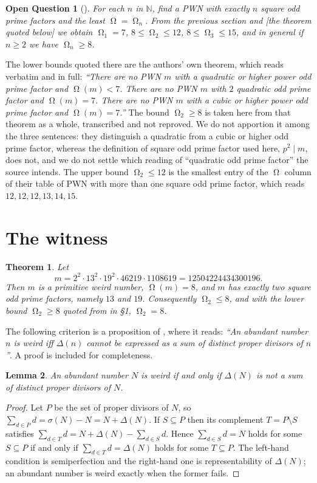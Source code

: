 \documentclass[11pt]{amsart}
\newtheorem{theorem}{Theorem}
\newtheorem{lemma}[theorem]{Lemma}
\DeclareMathOperator{\Om}{\Omega}
\newcommand{\sig}{\sigma}
\begin{document}
\medskip
\noindent\textbf{Open Question 1} (\cite{AHMP19}).
\emph{For each $n$ in $\mathbb N$, find a PWN with exactly $n$ square odd
prime factors and the least $\Om=\Om_n$. From the previous section and
\textup{[the theorem quoted below]} we obtain $\Om_1=7$,
$8\le\Om_2\le12$, $8\le\Om_3\le15$, and in general if $n\ge2$ we have
$\Om_n\ge8$.}

\medskip
The lower bounds quoted there are the authors' own theorem, which reads
verbatim and in full: \emph{``There are no PWN $m$ with a quadratic
or higher power odd prime factor and $\Om(m)<7$. There are no PWN $m$ with $2$
quadratic odd prime factor and $\Om(m)=7$. There are no PWN $m$ with a cubic
or higher power odd prime factor and $\Om(m)=7$.''} The bound $\Om_2\ge8$ is
taken here from that theorem as a whole, transcribed and not reproved. We do
not apportion it among the three sentences: they distinguish a quadratic from a
cubic or higher odd prime factor, whereas the definition of square odd prime
factor used here, $p^2\mid m$, does not, and we do not settle which reading of
``quadratic odd prime factor'' the source intends. The upper bound
$\Om_2\le12$ is the smallest entry of the $\Om$ column of their table of
PWN with more than one square odd prime factor, which reads
$12,12,12,13,14,15$.

\section{The witness}

\begin{theorem}\label{thm:main}
Let
\[
 m=2^2\cdot13^2\cdot19^2\cdot46219\cdot1108619=12504224434300196 .
\]
Then $m$ is a primitive weird number, $\Om(m)=8$, and $m$ has exactly two
square odd prime factors, namely $13$ and $19$. Consequently $\Om_2\le8$, and
with the lower bound $\Om_2\ge8$ quoted from \cite{AHMP19} in \S1, $\Om_2=8$.
\end{theorem}

The following criterion is a proposition of \cite{AHMP19}, where it reads:
\emph{``An abundant number $n$ is weird iff $\Delta(n)$ cannot be expressed
as a sum of distinct proper divisors of $n$''}. A proof is included for
completeness.

\begin{lemma}\label{lem:crit}
An abundant number $N$ is weird if and only if $\Delta(N)$ is not a sum of
distinct proper divisors of $N$.
\end{lemma}

\begin{proof}
Let $P$ be the set of proper divisors of $N$, so
$\sum_{d\in P}d=\sig(N)-N=N+\Delta(N)$. If $S\subseteq P$ then its
complement $T=P\setminus S$ satisfies
$\sum_{d\in T}d=N+\Delta(N)-\sum_{d\in S}d$. Hence
$\sum_{d\in S}d=N$ holds for some $S\subseteq P$ if and only if
$\sum_{d\in T}d=\Delta(N)$ holds for some $T\subseteq P$. The left-hand
condition is semiperfection and the right-hand one is representability of
$\Delta(N)$; an abundant number is weird exactly when the former fails.
\end{proof}
\end{document}
